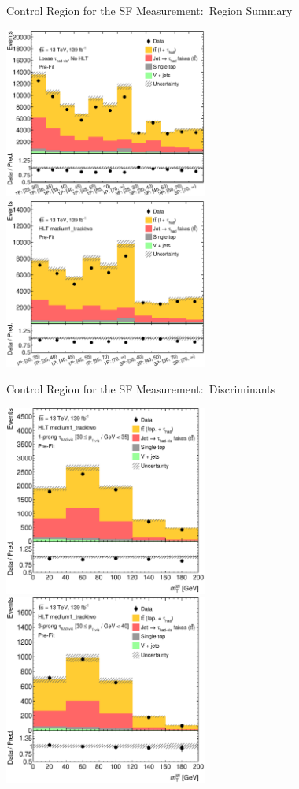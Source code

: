 \documentclass[11pt, xcolor={dvipsnames}, aspectratio=169]{beamer}
\begin{document}
\begin{frame}{Control Region for the SF Measurement:\ Region Summary}
  \centering

  \includegraphics[width=0.5\textwidth]{ttbarSF/Summary_offl}%
  \includegraphics[width=0.5\textwidth]{ttbarSF/Summary_tau25}

\end{frame}


\begin{frame}{Control Region for the SF Measurement:\ Discriminants}
  \centering

  \includegraphics[width=0.5\textwidth]{ttbarSF/tau25/TauPt3035_1P}%
  \includegraphics[width=0.5\textwidth]{ttbarSF/tau25/TauPt3040_3P}

\end{frame}
\end{document}

